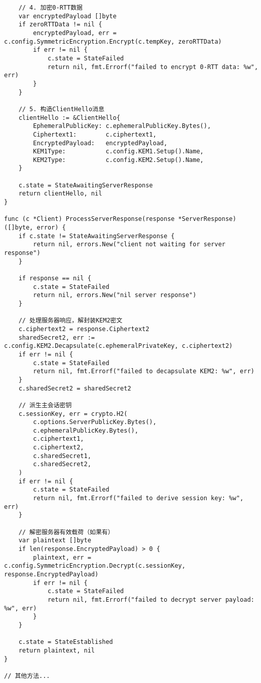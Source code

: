 \begin{verbatim}
    // 4. 加密0-RTT数据
    var encryptedPayload []byte
    if zeroRTTData != nil {
        encryptedPayload, err = c.config.SymmetricEncryption.Encrypt(c.tempKey, zeroRTTData)
        if err != nil {
            c.state = StateFailed
            return nil, fmt.Errorf("failed to encrypt 0-RTT data: %w", err)
        }
    }

    // 5. 构造ClientHello消息
    clientHello := &ClientHello{
        EphemeralPublicKey: c.ephemeralPublicKey.Bytes(),
        Ciphertext1:        c.ciphertext1,
        EncryptedPayload:   encryptedPayload,
        KEM1Type:           c.config.KEM1.Setup().Name,
        KEM2Type:           c.config.KEM2.Setup().Name,
    }

    c.state = StateAwaitingServerResponse
    return clientHello, nil
}

func (c *Client) ProcessServerResponse(response *ServerResponse) ([]byte, error) {
    if c.state != StateAwaitingServerResponse {
        return nil, errors.New("client not waiting for server response")
    }

    if response == nil {
        c.state = StateFailed
        return nil, errors.New("nil server response")
    }

    // 处理服务器响应，解封装KEM2密文
    c.ciphertext2 = response.Ciphertext2
    sharedSecret2, err := c.config.KEM2.Decapsulate(c.ephemeralPrivateKey, c.ciphertext2)
    if err != nil {
        c.state = StateFailed
        return nil, fmt.Errorf("failed to decapsulate KEM2: %w", err)
    }
    c.sharedSecret2 = sharedSecret2

    // 派生主会话密钥
    c.sessionKey, err = crypto.H2(
        c.options.ServerPublicKey.Bytes(),
        c.ephemeralPublicKey.Bytes(),
        c.ciphertext1,
        c.ciphertext2,
        c.sharedSecret1,
        c.sharedSecret2,
    )
    if err != nil {
        c.state = StateFailed
        return nil, fmt.Errorf("failed to derive session key: %w", err)
    }

    // 解密服务器有效载荷（如果有）
    var plaintext []byte
    if len(response.EncryptedPayload) > 0 {
        plaintext, err = c.config.SymmetricEncryption.Decrypt(c.sessionKey, response.EncryptedPayload)
        if err != nil {
            c.state = StateFailed
            return nil, fmt.Errorf("failed to decrypt server payload: %w", err)
        }
    }

    c.state = StateEstablished
    return plaintext, nil
}

// 其他方法...
\end{verbatim}

